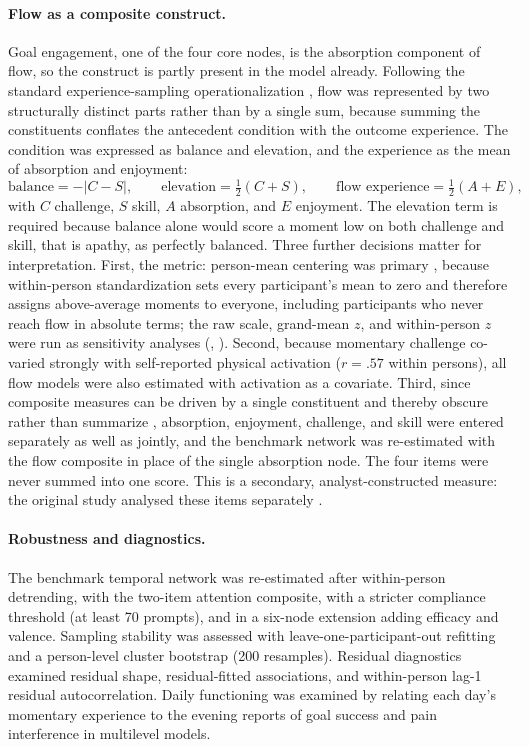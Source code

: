 \documentclass[11pt,a4paper]{article}
\begin{document}
\paragraph{Flow as a composite construct.} Goal engagement, one of the four core nodes, is the
absorption component of flow, so the construct is partly present in the model already. Following
the standard experience-sampling operationalization
\citep{massimini1988systematic,moneta1996effect}, flow was represented by two structurally
distinct parts rather than by a single sum, because summing the constituents conflates the
antecedent condition with the outcome experience. The condition was expressed as balance and
elevation, and the experience as the mean of absorption and enjoyment:
%
\begin{equation}
\text{balance} = -\lvert C - S \rvert, \qquad
\text{elevation} = \tfrac{1}{2}(C + S), \qquad
\text{flow experience} = \tfrac{1}{2}(A + E),
\label{eq:flow}
\end{equation}
%
with $C$ challenge, $S$ skill, $A$ absorption, and $E$ enjoyment. The elevation term is required
because balance alone would score a moment low on both challenge and skill, that is apathy, as
perfectly balanced. Three further decisions matter for interpretation. First, the metric:
person-mean centering was primary \citep{curran2011disaggregation}, because within-person standardization sets every participant's
mean to zero and therefore assigns above-average moments to everyone, including participants who
never reach flow in absolute terms; the raw scale, grand-mean $z$, and within-person $z$ were run
as sensitivity analyses (, ). Second, because momentary challenge co-varied strongly with self-reported
physical activation ($r=.57$ within persons), all flow models were also estimated with activation
as a covariate. Third, since composite measures can be driven by a single constituent and thereby
obscure rather than summarize \citep{vanderweele2022constructed}, absorption, enjoyment,
challenge, and skill were entered separately as well as jointly, and the benchmark network was
re-estimated with the flow composite in place of the single absorption node. The four items were
never summed into one score. This is a secondary, analyst-constructed measure: the original study
analysed these items separately \citep{viane2004acceptance}.

\paragraph{Robustness and diagnostics.} The benchmark temporal network was re-estimated after
within-person detrending, with the two-item attention composite, with a stricter compliance
threshold (at least 70 prompts), and in a six-node extension adding efficacy and valence.
Sampling stability was assessed with leave-one-participant-out refitting and a person-level
cluster bootstrap (200 resamples). Residual diagnostics examined residual shape, residual-fitted
associations, and within-person lag-1 residual autocorrelation. Daily functioning was examined
by relating each day's momentary experience to the evening reports of goal success and pain
interference in multilevel models.
\end{document}
